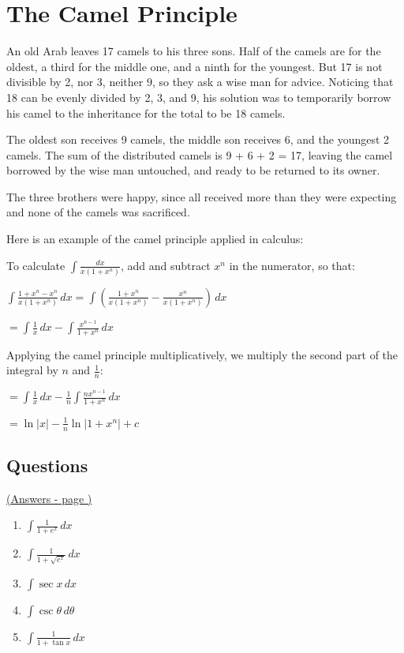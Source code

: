 \documentclass[../main.tex]{subfiles}
\begin{document}
\section{The Camel Principle}
An old Arab leaves 17 camels to his three sons. Half of the camels are for the oldest, a third for the middle one, and a ninth for the youngest. But 17 is not divisible by 2, nor 3, neither 9, so they ask a wise man for advice. Noticing that 18 can be evenly divided by 2, 3, and 9, his solution was to temporarily borrow his camel to the inheritance for the total to be 18 camels.

The oldest son receives 9 camels, the middle son receives 6, and the youngest 2 camels. The sum of the distributed camels is 9 + 6 + 2 = 17, leaving the camel borrowed by the wise man untouched, and ready to be returned to its owner.

The three brothers were happy, since all received more than they were expecting and none of the camels was sacrificed.

Here is an example of the camel principle applied in calculus:

To calculate \(\int \frac{dx}{x(1+x^n)}\), add and subtract \(x^n\) in the numerator, so that:

\(\int \frac{1+x^n-x^n}{x(1+x^n)}\,dx=\int (\frac{1+x^n}{x(1+x^n)}-\frac{x^n}{x(1+x^n)})\,dx\)

\(=\int \frac{1}{x}\,dx-\int \frac{x^{n-1}}{1+x^n}\,dx\)

Applying the camel principle multiplicatively, we multiply the second part of the integral by \(n\) and \(\frac{1}{n}\):

\(=\int \frac{1}{x}\,dx-\frac{1}{n}\int \frac{nx^{n-1}}{1+x^n}\,dx\)

\(=\ln{|x|}-\frac{1}{n}\ln{|1+x^n|}+c\)

\pagebreak
\hypertarget{camelprinciplelink}{\subsection*{Questions}}
\hyperlink{camelprincipleanswers}{(Answers - page {\pageref*{Camel principle answers}})}

\label{Camel Principle}

\begin{enumerate}
    \item \(\int \frac{1}{1+e^x}\,dx\)
    
    \item \(\int \frac{1}{1+\sqrt{e^x}}\,dx\)
    
    \item \(\int \sec{x}\,dx\)
    
    \item \(\int \csc{\theta}\,d\theta\)
    
    \item $\int \frac{1}{1+\tan{x}}\,dx$

\end{enumerate}
\end{document}
